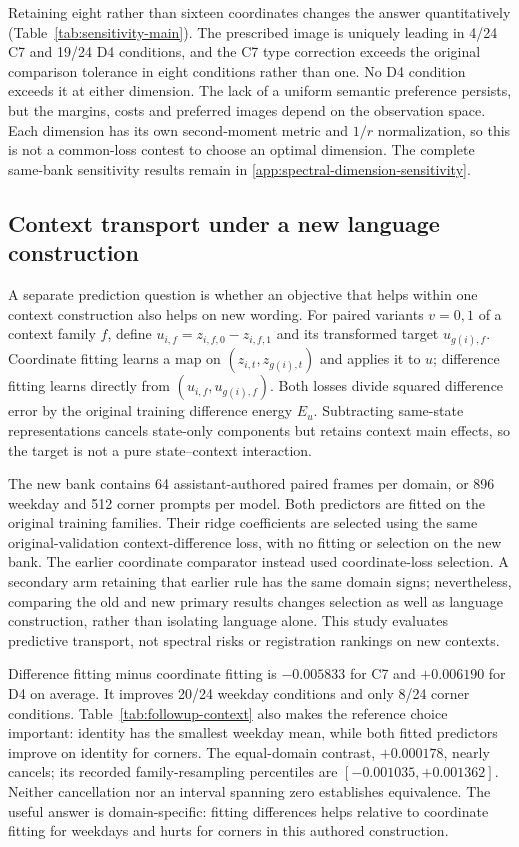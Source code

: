 
Retaining eight rather than sixteen coordinates changes the answer quantitatively (Table~\ref{tab:sensitivity-main}). The prescribed image is uniquely leading in 4/24 C7 and 19/24 D4 conditions, and the C7 type correction exceeds the original comparison tolerance in eight conditions rather than one. No D4 condition exceeds it at either dimension. The lack of a uniform semantic preference persists, but the margins, costs and preferred images depend on the observation space. Each dimension has its own second-moment metric and $1/r$ normalization, so this is not a common-loss contest to choose an optimal dimension. The complete same-bank sensitivity results remain in \cref{app:spectral-dimension-sensitivity}.

\subsection{Context transport under a new language construction}
\label{sec:new-context}

A separate prediction question is whether an objective that helps within one context construction also helps on new wording. For paired variants $v=0,1$ of a context family $f$, define $u_{i,f}=z_{i,f,0}-z_{i,f,1}$ and its transformed target $u_{g(i),f}$. Coordinate fitting learns a map on $(z_{i,t},z_{g(i),t})$ and applies it to $u$; difference fitting learns directly from $(u_{i,f},u_{g(i),f})$. Both losses divide squared difference error by the original training difference energy $E_u$. Subtracting same-state representations cancels state-only components but retains context main effects, so the target is not a pure state--context interaction.

The new bank contains 64 assistant-authored paired frames per domain, or 896 weekday and 512 corner prompts per model. Both predictors are fitted on the original training families. Their ridge coefficients are selected using the same original-validation context-difference loss, with no fitting or selection on the new bank. The earlier coordinate comparator instead used coordinate-loss selection. A secondary arm retaining that earlier rule has the same domain signs; nevertheless, comparing the old and new primary results changes selection as well as language construction, rather than isolating language alone. This study evaluates predictive transport, not spectral risks or registration rankings on new contexts.

Difference fitting minus coordinate fitting is $-0.005833$ for C7 and $+0.006190$ for D4 on average. It improves 20/24 weekday conditions and only 8/24 corner conditions. Table~\ref{tab:followup-context} also makes the reference choice important: identity has the smallest weekday mean, while both fitted predictors improve on identity for corners. The equal-domain contrast, $+0.000178$, nearly cancels; its recorded family-resampling percentiles are $[-0.001035,+0.001362]$. Neither cancellation nor an interval spanning zero establishes equivalence. The useful answer is domain-specific: fitting differences helps relative to coordinate fitting for weekdays and hurts for corners in this authored construction.

